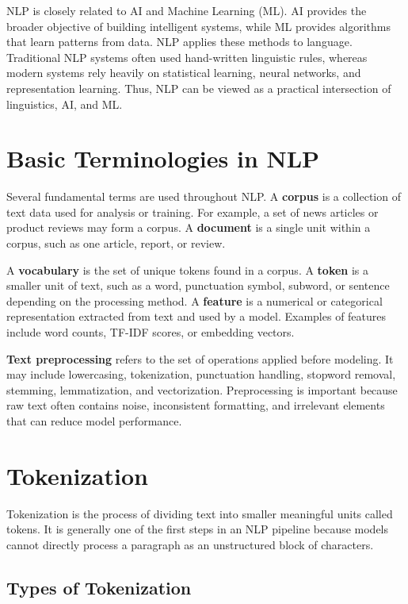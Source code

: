 \documentclass[10pt]{article}
\begin{document}
NLP is closely related to AI and Machine Learning (ML). AI provides the broader objective of building intelligent systems, while ML provides algorithms that learn patterns from data. NLP applies these methods to language. Traditional NLP systems often used hand-written linguistic rules, whereas modern systems rely heavily on statistical learning, neural networks, and representation learning. Thus, NLP can be viewed as a practical intersection of linguistics, AI, and ML.

\section{Basic Terminologies in NLP}

Several fundamental terms are used throughout NLP. A \textbf{corpus} is a collection of text data used for analysis or training. For example, a set of news articles or product reviews may form a corpus. A \textbf{document} is a single unit within a corpus, such as one article, report, or review.

A \textbf{vocabulary} is the set of unique tokens found in a corpus. A \textbf{token} is a smaller unit of text, such as a word, punctuation symbol, subword, or sentence depending on the processing method. A \textbf{feature} is a numerical or categorical representation extracted from text and used by a model. Examples of features include word counts, TF-IDF scores, or embedding vectors.

\textbf{Text preprocessing} refers to the set of operations applied before modeling. It may include lowercasing, tokenization, punctuation handling, stopword removal, stemming, lemmatization, and vectorization. Preprocessing is important because raw text often contains noise, inconsistent formatting, and irrelevant elements that can reduce model performance.

\section{Tokenization}

Tokenization is the process of dividing text into smaller meaningful units called tokens. It is generally one of the first steps in an NLP pipeline because models cannot directly process a paragraph as an unstructured block of characters.

\subsection{Types of Tokenization}
\end{document}
